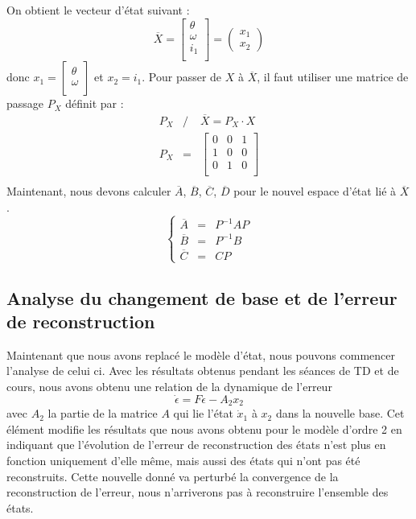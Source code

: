 On obtient le vecteur d'état suivant : 
\begin{equation}
\overline{X} = \begin{bmatrix}
\theta\\
\omega\\
i_1\\
\end{bmatrix} = \begin{pmatrix}
x_1\\x_2
\end{pmatrix}
\end{equation}
donc $x_1 = \begin{bmatrix}
\theta\\
\omega\\ \end{bmatrix}$ et $x_2 = i_1$. Pour passer de $X$ à $\overline{X}$, il faut utiliser une matrice de passage $P_X$ définit par :
 \begin{eqnarray}
 P_X &/&  \overline{X} =P_X \cdot X \\
 P_X &=&\begin{bmatrix}
 0 & 0 & 1 \\
 1 & 0 & 0 \\
 0 & 1 & 0 \\
\end{bmatrix}  \\
 \end{eqnarray}
Maintenant, nous devons calculer $\overline{A}$, $\overline{B}$, $\overline{C}$, $\overline{D}$ pour le nouvel espace d'état lié à $\overline{X}$.
\begin{equation}%
	\left\lbrace%
	\begin{matrix}
		\overline{A} &=& P^{-1} A P \\%
		\overline{B} &=& P^{-1} B \\%
		\overline{C} &=& C P%
	\end{matrix}
\right.%
\end{equation}

\subsection{Analyse du changement de base et de l'erreur de reconstruction}
Maintenant que nous avons replacé le modèle d'état, nous pouvons commencer l'analyse de celui ci. Avec les résultats obtenus pendant les séances de TD et de cours, nous avons obtenu une relation de la dynamique de l'erreur \begin{equation}\label{eqn:erreurRecompoOrdreSup}
\dot{\epsilon} = F\epsilon - A_2x_2
\end{equation}
avec $A_2$ la partie de la matrice $A$ qui lie l'état $\dot{x}_1$ à $x_2$ dans la nouvelle base. Cet élément modifie les résultats que nous avons obtenu pour le modèle d'ordre 2 en indiquant que l'évolution de l'erreur de reconstruction des états n'est plus en fonction uniquement d'elle même, mais aussi des états qui n'ont pas été reconstruits. Cette nouvelle donné va perturbé la convergence de la reconstruction de l'erreur, nous n'arriverons pas à reconstruire l'ensemble des états. 


